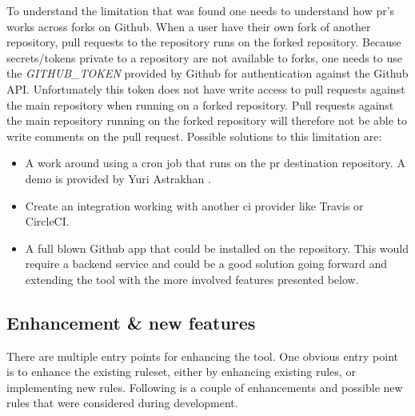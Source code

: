 \documentclass{report}
\begin{document}
\label{possible-solutions}
To understand the limitation that was found one needs to understand how \gls{pr}'s works across forks on Github. When a user have their own fork of another repository, pull requests to the repository runs on the forked repository. Because secrets/tokens private to a repository are not available to forks, one needs to use the \textit{GITHUB\_TOKEN} provided by Github for authentication against the Github API. Unfortunately this token does not have write access to pull requests against the main repository when running on a forked repository. Pull requests against the main repository running on the forked repository will therefore not be able to write comments on the pull request. Possible solutions to this limitation are: 
\begin{itemize}
    \item A work around using a cron job that runs on the \gls{pr} destination repository. A demo is provided by Yuri Astrakhan \cite{workaround-demo}. 
    
    \item Create an integration working with another \gls{ci} provider like Travis or CircleCI. 
    
    \item A full blown Github app that could be installed on the repository. This would require a backend service and could be a good solution going forward and extending the tool with the more involved features presented below.
\end{itemize}

\label{futurework}


\subsection{Enhancement \& new features}
There are multiple entry points for enhancing the tool. One obvious entry point is to enhance the existing ruleset, either by enhancing existing rules, or implementing new rules. Following is a couple of enhancements and possible new rules that were considered during development.
\end{document}
